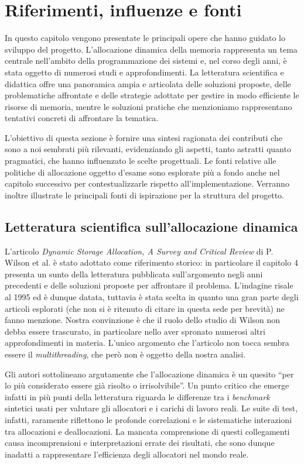 \chapter{Riferimenti, influenze e fonti}

In questo capitolo vengono presentate le principali opere che hanno guidato lo sviluppo del progetto. L’allocazione dinamica della memoria rappresenta un tema centrale nell’ambito della programmazione dei sistemi e, nel corso degli anni, è stata oggetto di numerosi studi e approfondimenti. La letteratura scientifica e didattica offre una panoramica ampia e articolata delle soluzioni proposte, delle problematiche affrontate e delle strategie adottate per gestire in modo efficiente le risorse di memoria, mentre le soluzioni pratiche che menzioniamo rappresentano tentativi concreti di affrontare la tematica. 

L’obiettivo di questa sezione è fornire una sintesi ragionata dei contributi che sono a noi sembrati più rilevanti, evidenziando gli aspetti, tanto astratti quanto pragmatici, che hanno influenzato le scelte progettuali. Le fonti relative alle politiche di allocazione oggetto d'esame sono esplorate più a fondo anche nel capitolo successivo per contestualizzarle rispetto all'implementazione. Verranno inoltre illustrate le principali fonti di ispirazione per la struttura del progetto.

\section{Letteratura scientifica sull’allocazione dinamica}

L’articolo \textit{Dynamic Storage Allocation, A Survey and Critical Review} di P. Wilson et al.\cite{wilson1995} è stato adottato come riferimento storico: in particolare il capitolo 4 presenta un sunto della letteratura pubblicata sull’argomento negli anni precedenti e delle soluzioni proposte per affrontare il problema. L'indagine risale al 1995 ed è dunque datata, tuttavia è stata scelta in quanto una gran parte degli articoli esplorati (che non si è ritenuto di citare in questa sede per brevità) ne fanno menzione. Nostra convinzione è che il ruolo dello studio di Wilson non debba essere trascurato, in particolare nello aver spronato numerosi altri approfondimenti in materia. L'unico argomento che l'articolo non tocca sembra essere il \textit{multithreading}, che però non è oggetto della nostra analisi. 

Gli autori sottolineano argutamente che l'allocazione dinamica è un quesito ``per lo più considerato essere già risolto o irrisolvibile''. Un punto critico che emerge infatti in più punti della letteratura riguarda le differenze tra i \textit{benchmark} sintetici usati per valutare gli allocatori e i carichi di lavoro reali. Le suite di test, infatti, raramente riflettono le profonde correlazioni e le sistematiche interazioni tra allocazioni e deallocazioni. La mancata comprensione di questi collegamenti causa incomprensioni e interpretazioni errate dei risultati, che sono dunque inadatti a rappresentare l’efficienza degli allocatori nel mondo reale. 

